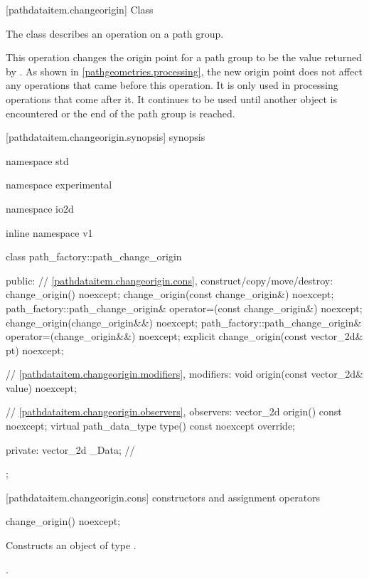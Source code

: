  [pathdataitem.changeorigin] {Class }

\pnum
{}
The class  describes an operation on a path group.

\pnum
This operation changes the origin point for a path group to be the value returned by . As shown in \ref{pathgeometries.processing}, the new origin point does not affect any operations that came before this operation. It is only used in processing operations that come after it. It continues to be used until another  object is encountered or the end of the path group is reached.

 [pathdataitem.changeorigin.synopsis] { synopsis}

\begin{codeblock}
namespace std { namespace experimental { namespace io2d { inline namespace v1 {
  class path_factory::path_change_origin {
  public:
    // \ref{pathdataitem.changeorigin.cons}, construct/copy/move/destroy:
    change_origin() noexcept;
    change_origin(const change_origin&) noexcept;
    path_factory::path_change_origin& operator=(const change_origin&) noexcept;
    change_origin(change_origin&&) noexcept;
    path_factory::path_change_origin& operator=(change_origin&&) noexcept;
    explicit change_origin(const vector_2d& pt) noexcept;

    // \ref{pathdataitem.changeorigin.modifiers}, modifiers:
    void origin(const vector_2d& value) noexcept;

    // \ref{pathdataitem.changeorigin.observers}, observers:
    vector_2d origin() const noexcept;
    virtual path_data_type type() const noexcept override;
    
  private:
    vector_2d _Data; // \expos
  };
} } } }
\end{codeblock}

 [pathdataitem.changeorigin.cons] { constructors and assignment operators}

\begin{itemdecl}
    change_origin() noexcept;
\end{itemdecl}
\begin{itemdescr}
	\pnum
	\effects
	Constructs an object of type .
	
	\pnum
	\postconditions
	.
\end{itemdescr}

